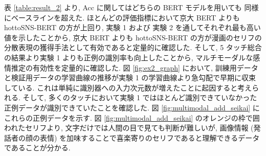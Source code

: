 表 \ref{table:result_2} より, Acc に関してはどちらの BERT モデルを用いても
同様にベースラインを超えた. ほとんどの評価指標において京大 BERT よりも hottoSNS-BERT の方が上回り, 実験 1 および 実験 2 を通してそれぞれ最も高い値を示したことから, 京大 BERT よりも hottoSNS-BERT の方が漫画のセリフの分散表現の獲得手法として有効であると定量的に確認した. そして, 5 タッチ総合の結果より実験 1 よりも正例の識別率も向上したことから, マルチモーダルな感情推定の有効性を定量的に確認した. 図 \ref{fig:ex2_graph} において, 訓練用データと検証用データの学習曲線の推移が実験 1 の学習曲線より急勾配で早期に収束している. これは単純に識別器への入力次元数が増えたことに起因すると考えられる. そして, 多くのタッチにおいて実験 1 ではほとんど識別できていなかった正例データが識別できていたことを確認した.
図 \ref{fig:multimodal_add_seikai} にこれらの正例データを示す. 図 \ref{fig:multimodal_add_seikai} のオレンジの枠で囲われたセリフより, 文字だけでは人間の目で見ても判断が難しいが, 画像情報 (発話者の顔の表情) を加味することで喜楽寄りのセリフであると理解できるデータであることが分かる.

